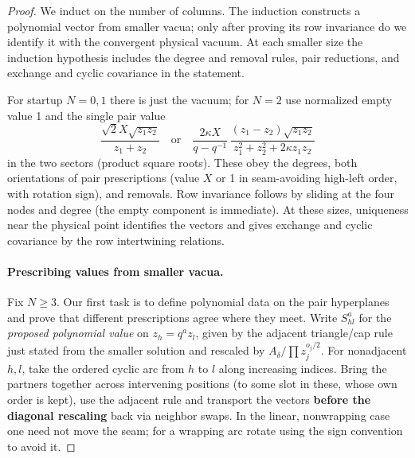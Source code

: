 \documentclass[11pt]{article}
\numberwithin{equation}{section}
\theoremstyle{definition}\newtheorem{definition}[theorem]{Definition}
\theoremstyle{remark}\newtheorem{remark}[theorem]{Remark}
\begin{document}
\begin{proof}
We induct on the number of columns. The induction constructs a polynomial
vector from smaller vacua; only after proving its row invariance do we
identify it with the convergent physical vacuum. At each smaller size the
induction hypothesis includes the degree and removal rules, pair reductions,
and exchange and cyclic covariance in the statement.

For startup \(N=0,1\) there is just the vacuum; for \(N=2\) use normalized empty value 1 and the single pair value
\[
 \frac{\sqrt2 X\sqrt{z_1 z_2}}{z_1+z_2}
 \quad\text{or}\quad
 \frac{2\kappa X}{q-q^{-1}}\,
 \frac{(z_1-z_2)\sqrt{z_1 z_2}}{z_1^2+z_2^2+2\kappa z_1z_2}
\]
in the two sectors (product square roots). These obey the degrees, both orientations of pair prescriptions (value \(X\) or 1 in seam-avoiding high-left order, with rotation sign), and removals. Row invariance follows by sliding at the four nodes and degree (the empty component is immediate). At these sizes, uniqueness near the physical point identifies the vectors and gives exchange and cyclic covariance by the row intertwining relations.

\paragraph{Prescribing values from smaller vacua.}
Fix $N\ge3$. Our first task is to define polynomial data on the pair
hyperplanes and prove that different prescriptions agree where they meet.
Write \(S_{hl}^a\) for the \emph{proposed polynomial value} on \(z_h=q^a z_l\), given by the adjacent triangle/cap rule just stated from the smaller solution and rescaled by \(A_\delta/\prod z_j^{o_j/2}\). For nonadjacent \(h,l\), take the ordered cyclic arc from \(h\) to \(l\) along increasing indices. Bring the partners together across intervening positions (to some slot in these, whose own order is kept), use the adjacent rule and transport the vectors \textbf{before the diagonal rescaling} back via neighbor swaps. In the linear, nonwrapping case one need not move the seam; for a wrapping arc rotate using the sign convention to avoid it.


\end{proof}
\end{document}
